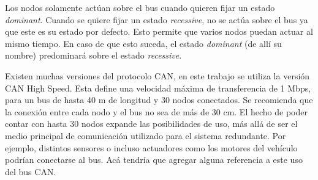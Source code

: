 Los nodos solamente actúan sobre el bus cuando quieren fijar un estado \textit{dominant}. Cuando se quiere fijar un estado \textit{recessive}, no se actúa sobre el bus ya que este es su estado por defecto. Esto permite que varios nodos puedan actuar al mismo tiempo. En caso de que esto suceda, el estado \textit{dominant} (de allí su nombre) predominará sobre el estado \textit{recessive}.

Existen muchas versiones del protocolo CAN, en este trabajo se utiliza la versión CAN High Speed. Esta define una velocidad máxima de transferencia de 1 Mbps, para un bus de hasta 40 m de longitud y 30 nodos conectados. Se recomienda que la conexión entre cada nodo y el bus no sea de más de 30 cm. El hecho de poder contar con hasta 30 nodos expande las posibilidades de uso, más allá de ser el medio principal de comunicación utilizado para el sistema redundante. Por ejemplo, distintos sensores o incluso actuadores como los motores del vehículo podrían conectarse al bus. {\color{red} Acá tendría que agregar alguna referencia a este uso del bus CAN}.





